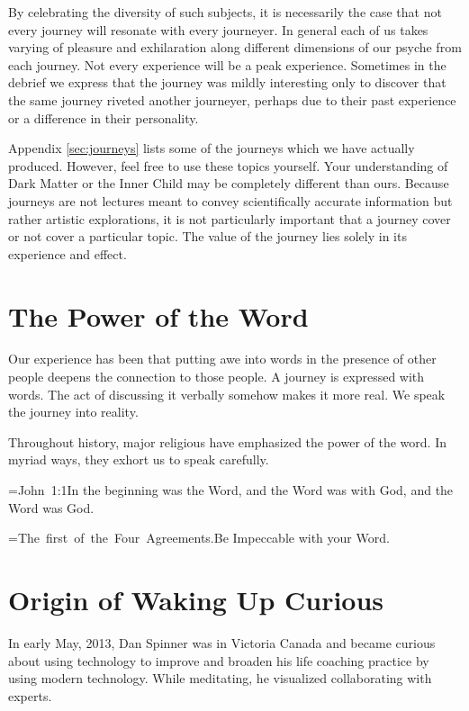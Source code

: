 \documentclass[12pt]{book}
\def\quoteattr#1#2{\setbox0=\hbox{#2}#1\tabto{\dimexpr\linewidth-\wd0}\box0}
\begin{document}
By celebrating the diversity of such subjects, it is necessarily the case that not every journey will resonate with every journeyer. In general each of us takes varying of pleasure and exhilaration along different dimensions of our psyche from each journey. Not every experience will be a peak experience. Sometimes in the debrief we express that the journey was mildly interesting only to discover that the same journey riveted another journeyer, perhaps due to their past experience or a difference in their personality.
					



Appendix \ref{sec:journeys} lists some of the journeys which we have actually produced. However, feel free to use these topics yourself. Your understanding of Dark Matter or the Inner Child may be completely different than ours. Because journeys are not lectures meant to convey scientifically accurate information but rather artistic explorations, it is not particularly important that a journey cover or not cover a particular topic. The value of the journey lies solely in its experience and effect.

\chapter{The Power of the Word}


Our experience has been that putting awe into words in the presence of other people deepens the connection
to those people. A journey is expressed with words. The act of discussing it verbally somehow makes it more real.
We speak the journey into reality.

Throughout history, major religious have emphasized the power of the word. In myriad ways, they
exhort us to speak carefully.

\quoteattr{In the beginning was the Word, and the Word was with God, and the Word was God.}{John 1:1}

\quoteattr{Be Impeccable with your Word.}{The first of the Four Agreements.\cite{ruiz2010four}}





\chapter{Origin of Waking Up Curious}

In early May, 2013, Dan Spinner was in Victoria Canada and became curious about using technology to improve and broaden his life coaching practice by using modern technology. While meditating, he visualized collaborating with experts.
					
\end{document}
